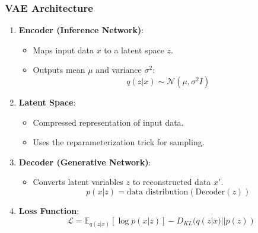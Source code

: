 \documentclass[aspectratio=169]{beamer}
\begin{document}
\begin{frame}[fragile]
    \frametitle{VAE Architecture}
    \begin{enumerate}
        \item \textbf{Encoder (Inference Network)}:
            \begin{itemize}
                \item Maps input data \( x \) to a latent space \( z \).
                \item Outputs mean \( \mu \) and variance \( \sigma^2 \):
                \begin{equation}
                    q(z|x) \sim \mathcal{N}(\mu, \sigma^2 I)
                \end{equation}
            \end{itemize}
        
        \item \textbf{Latent Space}:
            \begin{itemize}
                \item Compressed representation of input data.
                \item Uses the reparameterization trick for sampling.
            \end{itemize}
        
        \item \textbf{Decoder (Generative Network)}:
            \begin{itemize}
                \item Converts latent variables \( z \) to reconstructed data \( x' \).
                \begin{equation}
                    p(x|z) = \text{data distribution}(\text{Decoder}(z))
                \end{equation}
            \end{itemize}

        \item \textbf{Loss Function}:
            \begin{equation}
                \mathcal{L} = \mathbb{E}_{q(z|x)}[\log p(x|z)] - D_{KL}(q(z|x) || p(z))
            \end{equation}
        \end{enumerate}
\end{frame}
\end{document}
